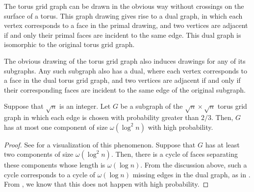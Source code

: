 \documentclass[format=acmsmall, review=false, screen=true]{acmart}
\begin{document}
The torus grid graph can be drawn in the obvious way without crossings
on the surface of a torus. This graph drawing gives rise to a dual
graph, in which each vertex corresponds to a face in the primal
drawing, and two vertices are adjacent if and only their primal faces
are incident to the same edge. This dual graph is isomorphic to the
original torus grid graph.

The obvious drawing of the torus grid graph also induces drawings for
any of its subgraphs. Any such subgraph also has a dual, where each
vertex corresponds to a face in the dual torus grid graph, and two
vertices are adjacent if and only if their corresponding faces are
incident to the same edge of the original subgraph.

\begin{thm}
  Suppose that $\sqrt{n}$ is an integer.  Let $G$ be a subgraph of the
  $\sqrt{n} \times \sqrt{n}$ torus grid graph in which each edge is
  chosen with probability greater than $2/3$. Then, $G$ has at most
  one component of size $\omega(\log^2 n)$ with high probability.
\end{thm}
\begin{proof}
  See  for a visualization of this phenomenon. Suppose
  that $G$ has at least two components of size $\omega(\log^2
  n)$. Then, there is a cycle of faces separating these components
  whose length is $\omega(\log n)$. From the discussion above, such a
  cycle corresponds to a cycle of $\omega(\log n)$ missing edges in
  the dual graph, as in . From
  , we know that this does not happen
  with high probability.
\end{proof}
\end{document}

